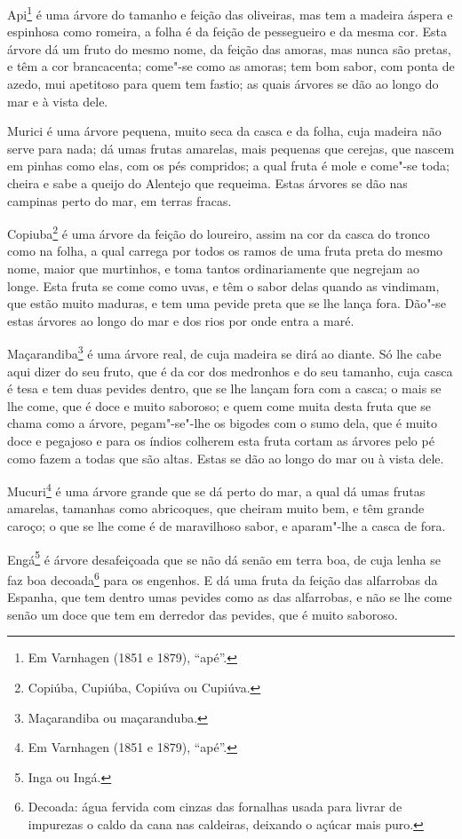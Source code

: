 Api\footnote{ Em Varnhagen (1851 e 1879), ``apé''.} é uma árvore do tamanho e feição das
oliveiras, mas tem a madeira áspera e espinhosa como romeira, a folha é da feição de
pessegueiro e da mesma cor. Esta árvore dá um fruto do mesmo nome, da feição das amoras,
mas nunca são pretas, e têm a cor brancacenta; come"-se como as amoras; tem bom sabor, com
ponta de azedo, mui apetitoso para quem tem fastio; as quais árvores se dão ao longo do
mar e à vista dele.

Murici é uma árvore pequena, muito seca da casca e da folha, cuja madeira não serve para
nada; dá umas frutas amarelas, mais pequenas que cerejas, que nascem em pinhas como elas,
com os pés compridos; a qual fruta é mole e come"-se toda; cheira e sabe a queijo do
Alentejo que requeima. Estas árvores se dão nas campinas perto do mar, em terras fracas.

Copiuba\footnote{ Copiúba, Cupiúba, Copiúva ou Cupiúva.} é uma árvore da feição do
loureiro, assim na cor da casca do tronco como na folha, a qual carrega por todos os ramos
de uma fruta preta do mesmo nome, maior que murtinhos, e toma tantos ordinariamente que
negrejam ao longe. Esta fruta se come como uvas, e têm o sabor delas quando as vindimam,
que estão muito maduras, e tem uma pevide preta que se lhe lança fora. Dão"-se estas
árvores ao longo do mar e dos rios por onde entra a maré.

Maçarandiba\footnote{ Maçarandiba ou maçaranduba.} é uma árvore real, de cuja madeira se
dirá ao diante. Só lhe cabe aqui dizer do seu fruto, que é da cor dos medronhos e do seu
tamanho, cuja casca é tesa e tem duas pevides dentro, que se lhe lançam fora com a casca;
o mais se lhe come, que é doce e muito saboroso; e quem come muita desta fruta que se
chama como a árvore, pegam"-se"-lhe os bigodes com o sumo dela, que é muito doce e pegajoso
e para os índios colherem esta fruta cortam as árvores pelo pé como fazem a todas que são
altas. Estas se dão ao longo do mar ou à vista dele.

Mucuri\footnote{ Em Varnhagen (1851 e 1879), ``apé''.} é uma árvore grande que se dá perto
do mar, a qual dá umas frutas amarelas, tamanhas como abricoques, que cheiram muito bem, e
têm grande caroço; o que se lhe come é de maravilhoso sabor, e aparam"-lhe a casca de fora.

Engá\footnote{ Inga ou Ingá.} é árvore desafeiçoada que se não dá senão em terra boa, de
cuja lenha se faz boa decoada\footnote{ Decoada: água fervida com cinzas das fornalhas
usada para livrar de impurezas o caldo da cana nas caldeiras, deixando o açúcar mais
puro.} para os engenhos. E dá uma fruta da feição das alfarrobas da Espanha, que tem
dentro umas pevides como as das alfarrobas, e não se lhe come senão um doce que tem em
derredor das pevides, que é muito saboroso.

